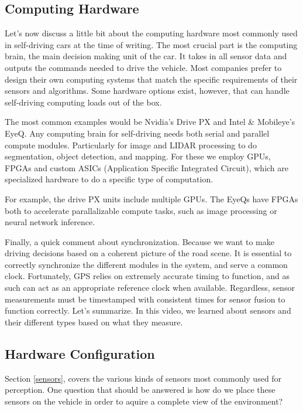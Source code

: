 \subsection{Computing Hardware}
\label{computing_hardware}

Let's now discuss a little bit about the computing hardware most commonly used in  self-driving cars at the time of writing. The most crucial part
is the computing brain, the main decision making unit of the car. It takes in all sensor data and outputs
the commands needed to drive the vehicle. Most companies prefer to design their own
computing systems that match the specific requirements of their sensors and
algorithms. Some hardware options exist, however, that can handle self-driving computing loads out of the box. 

The most common examples would be Nvidia's Drive PX and Intel \& Mobileye's EyeQ. Any computing brain for self-driving needs
both serial and parallel compute modules. Particularly for image and LIDAR processing to do segmentation, object detection, and mapping. 
For these we employ GPUs, FPGAs and custom ASICs (Application Specific Integrated Circuit), which are specialized hardware to
do a specific type of computation. 

For example, the drive PX units include multiple GPUs. The EyeQs have FPGAs both to
accelerate parallalizable compute tasks, such as image processing or
neural network inference. 

Finally, a quick comment about synchronization. Because we want to make driving
decisions based on a coherent picture of the road scene. It is essential to correctly synchronize
the different modules in the system, and serve a common clock. Fortunately, GPS relies on extremely
accurate timing to function, and as such can act as an appropriate
reference clock when available. Regardless, sensor measurements must be
timestamped with consistent times for sensor fusion to function correctly. Let's summarize. In this video,
we learned about sensors and their different types based
on what they measure. 

\subsection{Hardware Configuration}
\label{hardware_configuration}

Section \ref{sensors}, covers the various kinds of sensors most commonly used for perception. 
One question that should be answered is how do we place these sensors on the vehicle in order to  aquire a complete view of the environment? 


